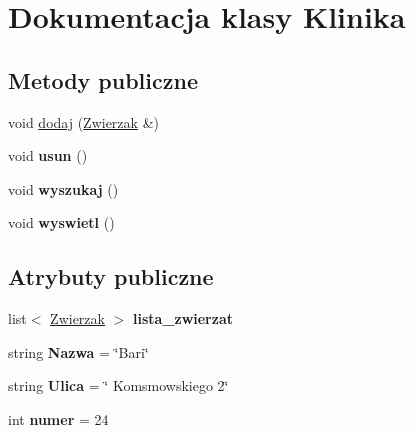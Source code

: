 \hypertarget{class_klinika}{}\section{Dokumentacja klasy Klinika}
\label{class_klinika}
\subsection*{Metody publiczne}
\begin{DoxyCompactItemize}
\item 
void \hyperlink{class_klinika_a2a0a9fc98c983c444ecd3d3056d6b7cc}{dodaj} (\hyperlink{class_zwierzak}{Zwierzak} \&)
\item 
void {\bfseries usun} ()\hypertarget{class_klinika_a9061d14ca355d8b862bdfb80b90cbf09}{}\label{class_klinika_a9061d14ca355d8b862bdfb80b90cbf09}

\item 
void {\bfseries wyszukaj} ()\hypertarget{class_klinika_a8ba3d0d069914516b476cdfde0479905}{}\label{class_klinika_a8ba3d0d069914516b476cdfde0479905}

\item 
void {\bfseries wyswietl} ()\hypertarget{class_klinika_a2d8f47cd4d1d2a74e006c9117fe40786}{}\label{class_klinika_a2d8f47cd4d1d2a74e006c9117fe40786}

\end{DoxyCompactItemize}
\subsection*{Atrybuty publiczne}
\begin{DoxyCompactItemize}
\item 
list$<$ \hyperlink{class_zwierzak}{Zwierzak} $>$ {\bfseries lista\+\_\+zwierzat}\hypertarget{class_klinika_a16fb2af6cf2590908b68ebf4ec99bb37}{}\label{class_klinika_a16fb2af6cf2590908b68ebf4ec99bb37}

\item 
string {\bfseries Nazwa} = \char`\"{}Bari\char`\"{}\hypertarget{class_klinika_af7c4fbb622fb15c5fd4e1bca1631d3d1}{}\label{class_klinika_af7c4fbb622fb15c5fd4e1bca1631d3d1}

\item 
string {\bfseries Ulica} = \char`\"{} Komsmowskiego 2\char`\"{}\hypertarget{class_klinika_a58f8f674729da531a7a7598d10425674}{}\label{class_klinika_a58f8f674729da531a7a7598d10425674}

\item 
int {\bfseries numer} = 24\hypertarget{class_klinika_a1041634c81e611fb7a892b36c525e32d}{}\label{class_klinika_a1041634c81e611fb7a892b36c525e32d}

\end{DoxyCompactItemize}


